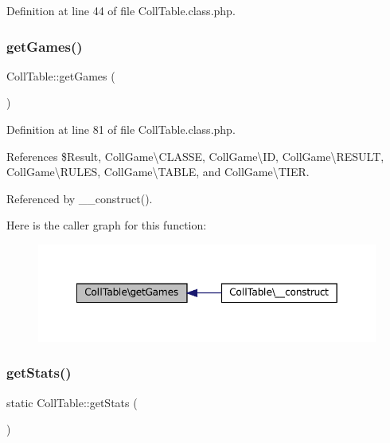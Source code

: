 Definition at line 44 of file Coll\+Table.\+class.\+php.

\mbox{\label{class_coll_table_a2550dbcff72781d7411ab095f0e46945}} 
\subsubsection{\texorpdfstring{get\+Games()}{getGames()}}
{\footnotesize\ttfamily Coll\+Table\+::get\+Games (\begin{DoxyParamCaption}{ }\end{DoxyParamCaption})\hspace{0.3cm}{\ttfamily [protected]}}



Definition at line 81 of file Coll\+Table.\+class.\+php.



References \$\+Result, Coll\+Game\textbackslash{}\+C\+L\+A\+S\+SE, Coll\+Game\textbackslash{}\+ID, Coll\+Game\textbackslash{}\+R\+E\+S\+U\+LT, Coll\+Game\textbackslash{}\+R\+U\+L\+ES, Coll\+Game\textbackslash{}\+T\+A\+B\+LE, and Coll\+Game\textbackslash{}\+T\+I\+ER.



Referenced by \+\_\+\+\_\+construct().

Here is the caller graph for this function\+:\nopagebreak
\begin{figure}[H]
\begin{center}
\leavevmode
\includegraphics[width=349pt]{class_coll_table_a2550dbcff72781d7411ab095f0e46945_icgraph}
\end{center}
\end{figure}
\mbox{\label{class_coll_table_a373e999ad096597ec5ef76f8ae434a27}} 
\subsubsection{\texorpdfstring{get\+Stats()}{getStats()}}
{\footnotesize\ttfamily static Coll\+Table\+::get\+Stats (\begin{DoxyParamCaption}{ }\end{DoxyParamCaption})\hspace{0.3cm}{\ttfamily [static]}}



